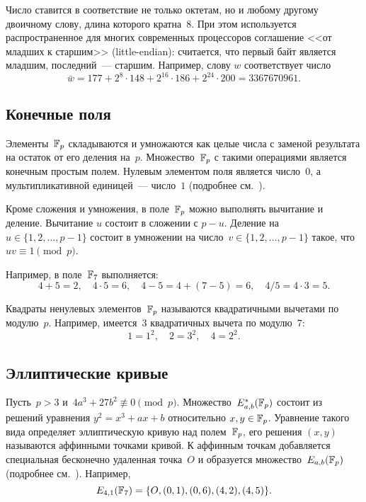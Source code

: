 Число ставится в соответствие не только октетам, но и любому другому
двоичному слову, длина которого кратна~$8$. 
%
При этом используется распространенное для многих современных 
процессоров соглашение <<от младших к старшим>> (little-endian):
считается, что первый байт является младшим, последний~--- старшим.
Например, слову $w$ соответствует число
$$
\bar{w}=177+2^{8}\cdot 148+2^{16}\cdot 186+2^{24}\cdot 200 = 3367670961.
$$

\subsection{Конечные поля}

Элементы~$\mathbb{F}_p$ складываются и умножаются 
как целые числа с заменой результата на остаток от его деления на~$p$.
Множество~$\mathbb{F}_p$ с такими операциями является конечным простым полем.
Нулевым элементом поля является число~$0$,
а мультипликативной единицей~--- число~$1$
(подробнее см.~\cite{LidNid88}).

Кроме сложения и умножения, в поле~$\mathbb{F}_p$ можно выполнять вычитание и деление. 
%
Вычитание $u$ состоит в сложении с $p-u$.
%
Деление на $u\in\{1,2,\ldots,p-1\}$ состоит в 
умножении на число~$v\in\{1,2,\ldots,p-1\}$ такое, 
что $uv\equiv 1\pmod{p}$.

Например, в поле~$\mathbb{F}_7$ выполняется:
$$
4+5=2,\quad
4\cdot 5=6,\quad
4-5=4+(7-5)=6,\quad
4/5 = 4\cdot 3=5.
$$

Квадраты ненулевых элементов~$\mathbb{F}_p$ 
называются квадратичными вычетами по модулю~$p$. 
Например, имеется~$3$ квадратичных вычета по модулю~$7$:
$$
1=1^2,\quad
2=3^2,\quad
4=2^2.
$$

\subsection{Эллиптические кривые}

Пусть~$p>3$ и~$4a^3+27b^2\not\equiv 0\pmod{p}$.
Множество~$E^*_{a,b}(\mathbb{F}_p)$ состоит из решений уравнения 
$y^2=x^3+ax+b$ относительно $x,y\in\mathbb{F}_p$. 
Уравнение такого вида определяет эллиптическую кривую над полем~$\mathbb{F}_p$,
его решения $(x,y)$ называются аффинными точками кривой.
К аффинным точкам добавляется специальная бесконечно удаленная
точка~$O$ и образуется множество~$E_{a,b}(\mathbb{F}_p)$
(подробнее см.~\cite{ECC}).
Например,
$$
E_{4,1}(\mathbb{F}_{7})=\{O,(0,1),(0,6),(4,2),(4,5)\}.
$$

